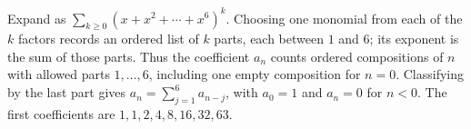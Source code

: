 Expand as $\sum_{k\ge0}(x+x^2+\cdots+x^6)^k$. Choosing one monomial from each of the $k$ factors records an ordered list of $k$ parts, each between $1$ and $6$; its exponent is the sum of those parts. Thus the coefficient $a_n$ counts ordered compositions of $n$ with allowed parts $1,\ldots,6$, including one empty composition for $n=0$. Classifying by the last part gives $a_n=\sum_{j=1}^6a_{n-j}$, with $a_0=1$ and $a_n=0$ for $n<0$. The first coefficients are $1,1,2,4,8,16,32,63$.
